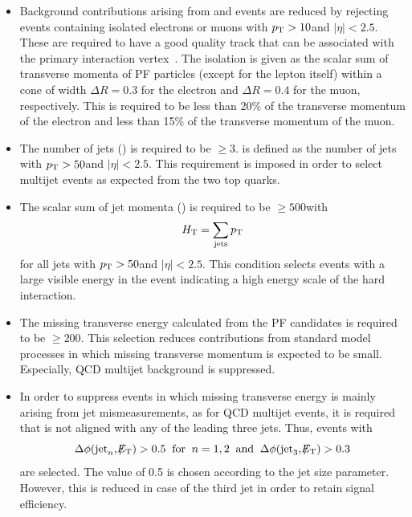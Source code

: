 \begin{itemize}
 \item{Background contributions arising from \ttbar and \WJets events are reduced by rejecting events containing isolated electrons or muons with $p_{\text{T}} > 10$\gev and $|\eta| < 2.5$. These are required to have a good quality track that can be associated with the primary interaction vertex~\cite{CMS-PAS-EGM-10-004, CMS-PAS-MUO-10-002}. The isolation is given as the scalar sum of transverse momenta of PF particles (except for the lepton itself) within a cone of width $\Delta R = 0.3$ for the electron and $\Delta R = 0.4$ for the muon, respectively. This is required to be less than 20\% of the transverse momentum of the electron and less than 15\% of the transverse momentum of the muon.}
 \item{The number of jets (\NJets) is required to be $\ge 3$. \NJets is defined as the number of jets with $p_{\text{T}} > 50$\gev and $|\eta| < 2.5$. This requirement is imposed in order to select multijet events as expected from the two top quarks.}
 \item{The scalar sum of jet momenta (\HT) is required to be $\ge 500$\gev with 
\begin{equation*}
H_{\text{T}} = \sum_{\mathrm{jets}} p_{\text{T}} 
\end{equation*}
for all jets with $p_{\text{T}} > 50$\gev and $|\eta| < 2.5$. This condition selects events with a large visible energy in the event indicating a high energy scale of the hard interaction.}   
 \item{The missing transverse energy \met calculated from the PF candidates is required to be $\ge 200$\gev. This selection reduces contributions from standard model processes in which missing transverse momentum is expected to be small. Especially, QCD multijet background is suppressed. } 
 \item{In order to suppress events in which missing transverse energy is mainly arising from jet mismeasurements, as for QCD multijet events, it is required that \met is not aligned with any of the leading three jets. Thus, events with
\begin{equation*}
\Delta \phi(\mathrm{jet}_n, \slash\mkern-12mu{E}_{\text{T}}) > 0.5 \;\; \mathrm{for} \;\; n = 1,2 \;\; \mathrm{and} \;\; \Delta \phi(\mathrm{jet}_3, \slash\mkern-12mu{E}_{\text{T}}) > 0.3
\end{equation*} 
are selected. The value of 0.5 is chosen according to the jet size parameter. However, this is reduced in case of the third jet in order to retain signal efficiency. }
\end{itemize}
